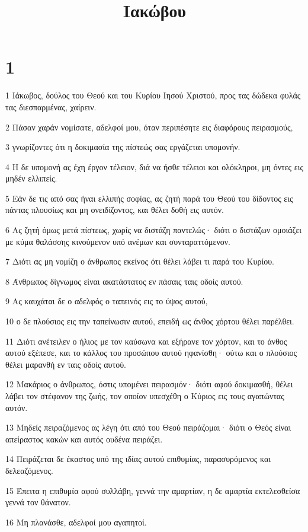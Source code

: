 

\title{Ιακώβου}


\chapter{1}

\par 1 Ιάκωβος, δούλος του Θεού και του Κυρίου Ιησού Χριστού, προς τας δώδεκα φυλάς τας διεσπαρμένας, χαίρειν.
\par 2 Πάσαν χαράν νομίσατε, αδελφοί μου, όταν περιπέσητε εις διαφόρους πειρασμούς,
\par 3 γνωρίζοντες ότι η δοκιμασία της πίστεώς σας εργάζεται υπομονήν.
\par 4 Η δε υπομονή ας έχη έργον τέλειον, διά να ήσθε τέλειοι και ολόκληροι, μη όντες εις μηδέν ελλιπείς.
\par 5 Εάν δε τις από σας ήναι ελλιπής σοφίας, ας ζητή παρά του Θεού του δίδοντος εις πάντας πλουσίως και μη ονειδίζοντος, και θέλει δοθή εις αυτόν.
\par 6 Ας ζητή όμως μετά πίστεως, χωρίς να διστάζη παντελώς· διότι ο διστάζων ομοιάζει με κύμα θαλάσσης κινούμενον υπό ανέμων και συνταραττόμενον.
\par 7 Διότι ας μη νομίζη ο άνθρωπος εκείνος ότι θέλει λάβει τι παρά του Κυρίου.
\par 8 Άνθρωπος δίγνωμος είναι ακατάστατος εν πάσαις ταις οδοίς αυτού.
\par 9 Ας καυχάται δε ο αδελφός ο ταπεινός εις το ύψος αυτού,
\par 10 ο δε πλούσιος εις την ταπείνωσιν αυτού, επειδή ως άνθος χόρτου θέλει παρέλθει.
\par 11 Διότι ανέτειλεν ο ήλιος με τον καύσωνα και εξήρανε τον χόρτον, και το άνθος αυτού εξέπεσε, και το κάλλος του προσώπου αυτού ηφανίσθη· ούτω και ο πλούσιος θέλει μαρανθή εν ταις οδοίς αυτού.
\par 12 Μακάριος ο άνθρωπος, όστις υπομένει πειρασμόν· διότι αφού δοκιμασθή, θέλει λάβει τον στέφανον της ζωής, τον οποίον υπεσχέθη ο Κύριος εις τους αγαπώντας αυτόν.
\par 13 Μηδείς πειραζόμενος ας λέγη ότι από του Θεού πειράζομαι· διότι ο Θεός είναι απείραστος κακών και αυτός ουδένα πειράζει.
\par 14 Πειράζεται δε έκαστος υπό της ιδίας αυτού επιθυμίας, παρασυρόμενος και δελεαζόμενος.
\par 15 Έπειτα η επιθυμία αφού συλλάβη, γεννά την αμαρτίαν, η δε αμαρτία εκτελεσθείσα γεννά τον θάνατον.
\par 16 Μη πλανάσθε, αδελφοί μου αγαπητοί.
